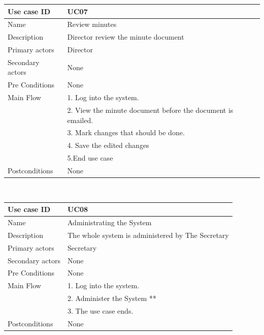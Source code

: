 \documentclass[a4paper,beamer]{article}
\begin{document}
			\begin{tabular}{|p{4cm}|p{8cm}|} \hline 
					\textbf{Use case ID} & \textbf{UC07}  \\ \hline
					Name & Review minutes \\ \hline 
					Description & Director review the minute document \\ \hline 
					Primary actors & Director \\ \hline 
					Secondary actors & None \\ \hline 
					Pre Conditions & None \\ \hline
					Main Flow & 1. Log into the system.\\
										& 2. View the minute document before the  document is emailed. \\
										& 3. Mark changes that should be done.\\
										& 4. Save the edited changes \\
										& 5.End use case \\ \hline
					Postconditions & None \\ \hline 
			\end{tabular} \\[.6cm]
			
			\begin{tabular}{|p{4cm}|p{8cm}|} \hline 
					\textbf{Use case ID} & \textbf{UC08}  \\ \hline
					Name & Administrating the System \\ \hline 
					Description & The whole system is administered by The Secretary \\ \hline 
					Primary actors & Secretary \\ \hline 
					Secondary actors & None \\ \hline 
					Pre Conditions & None \\ \hline
					Main Flow &	1. Log into the system.\\
										& 2. Administer the System ** \\
										& 3. The use case ends.\\ \hline
					Postconditions & None \\ \hline 
			\end{tabular} \\[.6cm]
			
\end{document}

